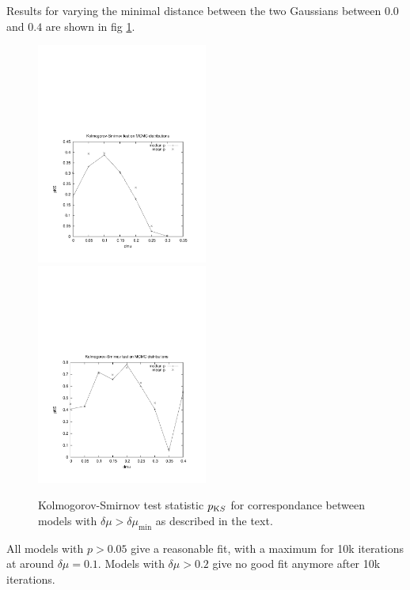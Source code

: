 Results for varying the minimal distance between the two Gaussians
between $0.0$ and $0.4$ are shown in fig \ref{fig:kit}.

\begin{figure}
\begin{center}
\hspace{-7mm}
\includegraphics[width=0.5\textwidth]{fig/10kit.pdf}
\includegraphics[width=0.5\textwidth]{fig/50kit.pdf}
\caption{Kolmogorov-Smirnov test statistic $p_{\text KS}$ for
  correspondance between models with $\delta\mu>\delta\mu_{\min}$ as
  described in the text.}
\label{fig:kit}
\end{center}
\end{figure}


All models with $p>0.05$ give a reasonable fit, with a maximum for 10k
iterations at around $\delta \mu = 0.1$. Models with $\delta \mu>0.2$
give no good fit anymore after 10k iterations.

